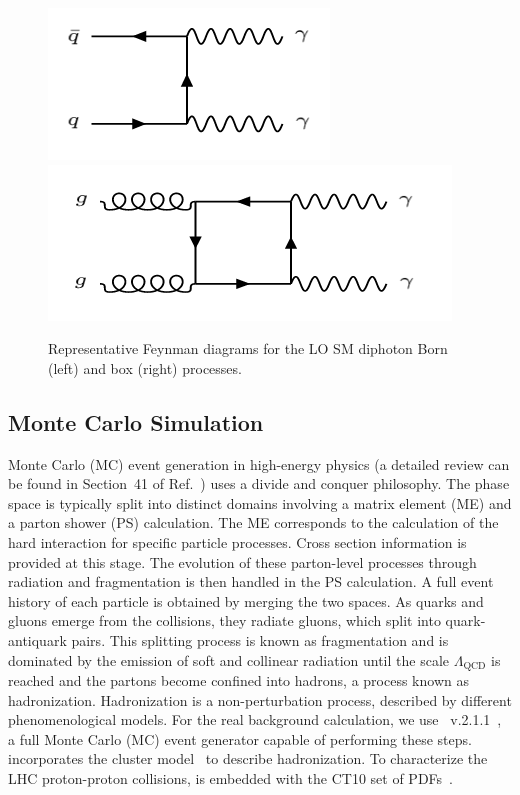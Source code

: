 \begin{figure}[!htbp]
  \centering
  \includegraphics[scale=0.55]{figures/born}
  \includegraphics[scale=0.55]{figures/box}
  \caption{Representative Feynman diagrams for the LO SM diphoton Born (left) and box (right) processes.}
  \label{fig:sm_background_diagrams}
\end{figure}


\subsection{Monte Carlo Simulation}

Monte Carlo (MC) event generation in high-energy physics (a detailed review can be found in Section~41 of Ref.~\cite{Tanabashi:2018oca}) uses a divide and conquer philosophy. The phase space is typically split into distinct domains involving a matrix element (ME) and a parton shower (PS) calculation. The ME corresponds to the calculation of the hard interaction for specific particle processes. Cross section information is provided at this stage. The evolution of these parton-level processes through radiation and fragmentation is then handled in the PS calculation. A full event history of each particle is obtained by merging the two spaces. As quarks and gluons emerge from the collisions, they radiate gluons, which split into quark-antiquark pairs. This splitting process is known as fragmentation and is dominated by the emission of soft and collinear radiation until the scale $\Lambda_{\mathrm{QCD}}$ is reached and the partons become confined into hadrons, a process known as hadronization. Hadronization is a non-perturbation process, described by different phenomenological models. For the real background calculation, we use \SHERPA~v.2.1.1~\cite{Gleisberg:2008ta}, a full Monte Carlo (MC) event generator capable of performing these steps. \SHERPA incorporates the cluster model~\cite{Webber:1983if,Winter:2003tt} to describe hadronization. To characterize the LHC proton-proton collisions, \SHERPA is embedded with the CT10 set of PDFs~\cite{Lai:2010vv,Gao:2013xoa}.

